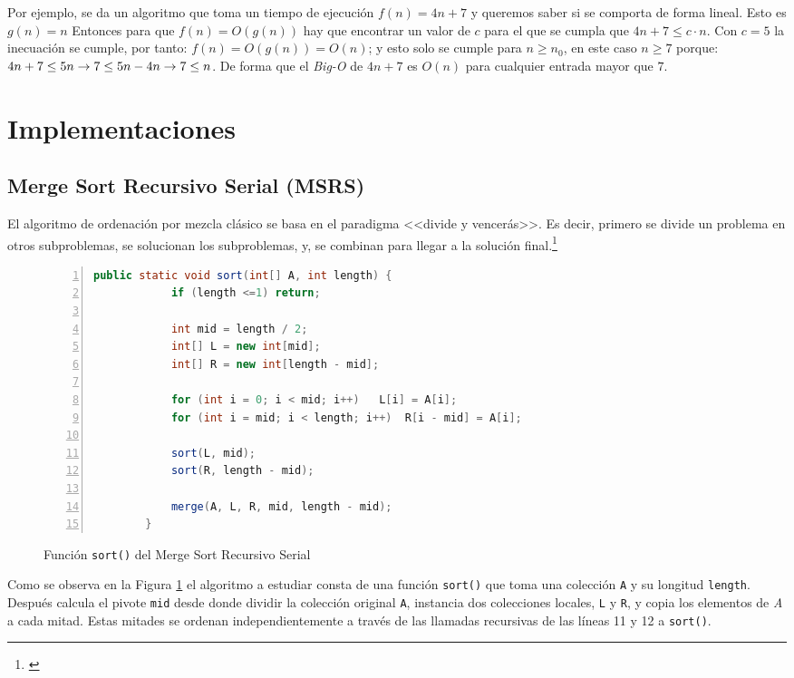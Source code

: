 \documentclass[titlepage]{article}
\begin{document}
Por ejemplo, se da un algoritmo que toma un tiempo de ejecución \(f(n) = 4n+7\) y queremos saber si se comporta de forma lineal. Esto es \(g(n)=n\) Entonces para que \(f(n) = O(g(n))\) hay que encontrar un valor de \(c\) para el que se cumpla que \(4n+7 \leq c\cdot n\). Con \(c=5\) la inecuación se cumple, por tanto: \(f(n) = O(g(n)) = O(n)\); y esto solo se cumple para \(n \geq n_0\), en este caso \(n\geq 7\) porque: \(4n+7 \leq 5n \space \rightarrow 7 \leq 5n - 4n   \rightarrow 7 \leq n\). De forma que el \textit{Big-O} de \(4n+7\) es \(O(n)\) para cualquier entrada mayor que \(7\).



\section{Implementaciones}

\subsection{Merge Sort Recursivo Serial (MSRS)}
El algoritmo de ordenación por mezcla clásico se basa en el paradigma <<divide y vencerás>>. Es decir, primero se divide un problema en otros subproblemas, se solucionan los subproblemas, y, se combinan para llegar a la solución
final.\footnote{\cite{Sedgewick2003-cd}}

\begin{figure}[hbtp]
    \begin{lstlisting}[language=java, frame=single, numbers=left]
        public static void sort(int[] A, int length) {
            if (length <=1) return;
    
            int mid = length / 2;
            int[] L = new int[mid];
            int[] R = new int[length - mid];
    
            for (int i = 0; i < mid; i++)   L[i] = A[i];
            for (int i = mid; i < length; i++)  R[i - mid] = A[i];
    
            sort(L, mid);
            sort(R, length - mid);
    
            merge(A, L, R, mid, length - mid);
        }
    \end{lstlisting}
    \caption{Función \lstinline{sort()} del Merge Sort Recursivo Serial}
    \label{fig:MSRS_sort()}
\end{figure}

Como se observa en la Figura \ref{fig:MSRS_sort()} el algoritmo a estudiar consta de una función \lstinline{sort()} que toma una colección \lstinline{A} y su longitud \lstinline{length}. Después calcula el pivote \lstinline{mid} desde donde dividir la colección original \lstinline{A}, instancia dos colecciones locales, \lstinline{L} y \lstinline{R}, y copia los elementos de \textit{A} a cada mitad. Estas mitades se ordenan independientemente a través de las llamadas recursivas de las líneas 11 y 12 a \lstinline{sort()}. 
\end{document}
